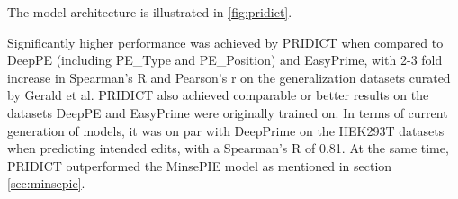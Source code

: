 The model architecture is illustrated in \autoref{fig:pridict}.

Significantly higher performance was achieved by PRIDICT when compared to DeepPE (including PE\_Type and PE\_Position) and EasyPrime, with 2-3 fold increase in Spearman's R and Pearson's r on the generalization datasets curated by Gerald et al. PRIDICT also achieved comparable or better results on the datasets DeepPE and EasyPrime were originally trained on. In terms of current generation of models, it was on par with DeepPrime on the HEK293T datasets when predicting intended edits, with a Spearman's R of 0.81. At the same time, PRIDICT outperformed the MinsePIE model as mentioned in section \ref{sec:minsepie}.
